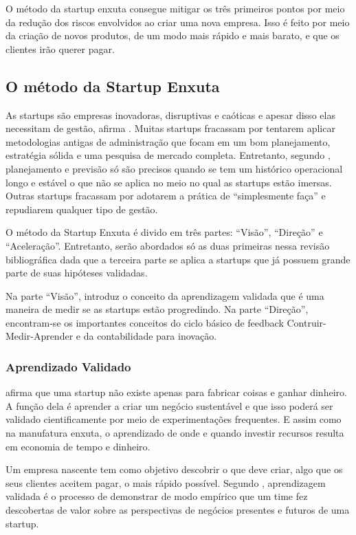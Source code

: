 O método da startup enxuta consegue mitigar os três primeiros pontos por meio da redução dos riscos envolvidos ao criar uma nova empresa. Isso é feito por meio da criação de novos produtos, de um modo mais rápido e mais barato, e que os clientes irão querer pagar.

\subsection{O método da Startup Enxuta}
\label{cha:metodostartupenxuta}
As startups são empresas inovadoras, disruptivas e caóticas e apesar disso elas necessitam de gestão, afirma . Muitas startups fracassam por tentarem aplicar metodologias antigas de administração que focam em um bom planejamento, estratégia sólida e uma pesquisa de mercado completa. Entretanto, segundo , planejamento e previsão só são precisos quando se tem um histórico operacional longo e estável o que não se aplica no meio no qual as startups estão imersas. Outras startups fracassam por adotarem a prática de \enquote{simplesmente faça} e repudiarem qualquer tipo de gestão.

O método da Startup Enxuta é divido em três partes: \enquote{Visão}, \enquote{Direção} e \enquote{Aceleração}. Entretanto, serão abordados só as duas primeiras nessa revisão bibliográfica dada que a terceira parte se aplica a startups que já possuem grande parte de suas hipóteses validadas.

Na parte \enquote{Visão},  introduz o conceito da aprendizagem validada que é uma maneira de medir se as startups estão progredindo. Na parte \enquote{Direção}, encontram-se os importantes conceitos do ciclo básico de feedback Contruir-Medir-Aprender e da contabilidade para inovação.


\subsubsection{Aprendizado Validado}
\label{cha:apredizado_validado}
 afirma que uma startup não existe apenas para fabricar coisas e ganhar dinheiro. A função dela é aprender a criar um negócio sustentável e que isso poderá ser validado cientificamente por meio de experimentações frequentes. E assim como na manufatura enxuta, o aprendizado de onde e quando investir recursos resulta em economia de tempo e dinheiro.

Um empresa nascente tem como objetivo descobrir o que deve criar, algo que os seus clientes aceitem pagar, o mais rápido possível. Segundo , aprendizagem validada é o processo de demonstrar de modo empírico que um time fez descobertas de valor sobre as perspectivas de negócios presentes e futuros de uma startup.

